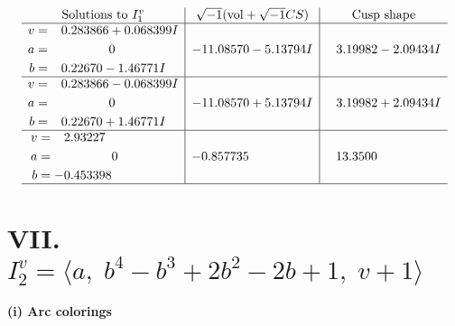 \documentclass[1p]{elsarticle_modified}
\theoremstyle{definition}
\newcommand{\I}{\sqrt{-1}}
\begin{document}
$$\begin{array}{c|c|c}  
\text{Solutions to }I^v_{1}& \I (\text{vol} + \sqrt{-1}CS) & \text{Cusp shape}\\
 \hline 
\begin{aligned}
v &= \phantom{-}0.283866 + 0.068399 I \\
a &= \phantom{-0.000000 } 0 \\
b &= \phantom{-}0.22670 - 1.46771 I\end{aligned}
 & -11.08570 - 5.13794 I & \phantom{-}3.19982 - 2.09434 I \\ \hline\begin{aligned}
v &= \phantom{-}0.283866 - 0.068399 I \\
a &= \phantom{-0.000000 } 0 \\
b &= \phantom{-}0.22670 + 1.46771 I\end{aligned}
 & -11.08570 + 5.13794 I & \phantom{-}3.19982 + 2.09434 I \\ \hline\begin{aligned}
v &= \phantom{-}2.93227\phantom{ +0.000000I} \\
a &= \phantom{-0.000000 } 0 \\
b &= -0.453398\phantom{ +0.000000I}\end{aligned}
 & -0.857735\phantom{ +0.000000I} & \phantom{-}13.3500\phantom{ +0.000000I}\\
 \hline 
 \end{array}$$\newpage\newpage\renewcommand{\arraystretch}{1}
\centering \section*{VII. $I^v_{2}= \langle a,\;b^4- b^3+2 b^2-2 b+1,\;v+1 \rangle$}
\flushleft \textbf{(i) Arc colorings}\\
\end{document}

